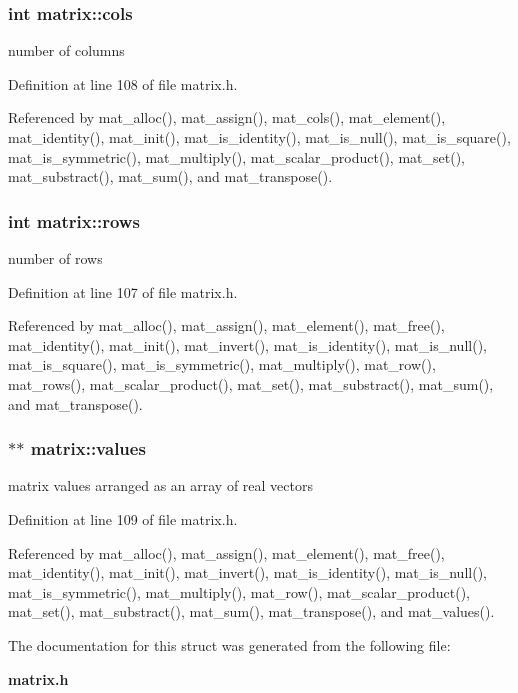 \subsubsection{\setlength{\rightskip}{0pt plus 5cm}int matrix::cols}\label{structmatrix_m1}


number of columns 

Definition at line 108 of file matrix.h.

Referenced by mat\_\-alloc(), mat\_\-assign(), mat\_\-cols(), mat\_\-element(), mat\_\-identity(), mat\_\-init(), mat\_\-is\_\-identity(), mat\_\-is\_\-null(), mat\_\-is\_\-square(), mat\_\-is\_\-symmetric(), mat\_\-multiply(), mat\_\-scalar\_\-product(), mat\_\-set(), mat\_\-substract(), mat\_\-sum(), and mat\_\-transpose().
\subsubsection{\setlength{\rightskip}{0pt plus 5cm}int matrix::rows}\label{structmatrix_m0}


number of rows 

Definition at line 107 of file matrix.h.

Referenced by mat\_\-alloc(), mat\_\-assign(), mat\_\-element(), mat\_\-free(), mat\_\-identity(), mat\_\-init(), mat\_\-invert(), mat\_\-is\_\-identity(), mat\_\-is\_\-null(), mat\_\-is\_\-square(), mat\_\-is\_\-symmetric(), mat\_\-multiply(), mat\_\-row(), mat\_\-rows(), mat\_\-scalar\_\-product(), mat\_\-set(), mat\_\-substract(), mat\_\-sum(), and mat\_\-transpose().
\subsubsection{$\ast$$\ast$ matrix::values}\label{structmatrix_m2}


matrix values arranged as an array of real vectors 

Definition at line 109 of file matrix.h.

Referenced by mat\_\-alloc(), mat\_\-assign(), mat\_\-element(), mat\_\-free(), mat\_\-identity(), mat\_\-init(), mat\_\-invert(), mat\_\-is\_\-identity(), mat\_\-is\_\-null(), mat\_\-is\_\-symmetric(), mat\_\-multiply(), mat\_\-row(), mat\_\-scalar\_\-product(), mat\_\-set(), mat\_\-substract(), mat\_\-sum(), mat\_\-transpose(), and mat\_\-values().

The documentation for this struct was generated from the following file:\begin{CompactItemize}
\item 
{\bf matrix.h}\end{CompactItemize}
